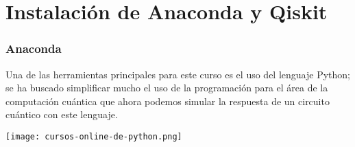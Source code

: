 \documentclass[spanish]{beamer}
\begin{document}

\newpage\section{Instalación de Anaconda y Qiskit}
\begin{frame}\frametitle{Anaconda}
\setlength{\parskip}{5mm}\justify
Una de las herramientas principales para este curso es el uso del lenguaje Python; se ha buscado simplificar mucho el uso de la programación para el área de la computación cuántica que ahora podemos simular la respuesta de un circuito cuántico con este lenguaje.

\centering\texttt{[image: cursos-online-de-python.png]}

\end{frame}
\end{document}
